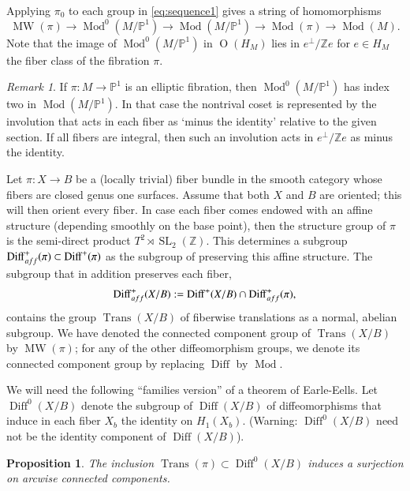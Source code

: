 \documentclass[10pt,letterpaper]{amsart}
\numberwithin{equation}{section}
\def\PP{{\mathbb P}}
\def\Pb{{\mathbb P}}
\def\ZZ{{\mathbb Z}}
\def\aff{{\rm aff}}
\newcommand\Diff{\operatorname{Diff}}
\newcommand\Mod{\operatorname{Mod}}
\newcommand\MW{\operatorname{MW}}
\newcommand\SL{\operatorname{SL}}
\newcommand\Orth{\operatorname{O}}
\newcommand\Trans{\operatorname{Trans}}
\newtheorem{proposition}[theorem]{Proposition}
\theoremstyle{remark}
\newtheorem{remark}[theorem]{Remark}
\begin{document}
Applying $\pi_0$ to each group in \eqref{eq:sequence1} gives a string of homomorphisms
\begin{equation}
\label{eq:sequence2}
\MW(\pi)\to\Mod^0(M/\Pb^1)\to\Mod(M/\Pb^1)\to
\Mod(\pi)\to\Mod(M).
\end{equation}
Note that the image of $\Mod^0(M/\Pb^1)$ in $\Orth(H_M)$ lies in $e^\perp/\ZZ e$ for $e\in H_M$ the fiber class of the fibration $\pi$.

\begin{remark}\label{rem:index2}
If $\pi:M\to \PP^1$ is an elliptic fibration, then  $\Mod^0(M/\Pb^1)$  has index two in $\Mod(M/\Pb^1)$. In that case the nontrival coset is represented by the  involution that acts in each fiber as `minus the identity' relative to the given section. If all fibers are integral,  then such an involution acts in $e^\perp/\ZZ e$ as minus the identity.
\end{remark}

Let $\pi :X\to B$ be a (locally trivial) fiber bundle in the smooth category whose 
fibers are closed genus one surfaces.  Assume that both $X$ and $B$ are oriented; this will 
then  orient every fiber.  In case each fiber comes  endowed with an affine structure 
(depending smoothly on the base point), then  the structure group of $\pi$ is the 
semi-direct product  $T^2\rtimes \SL_2(\ZZ)$. This determines a subgroup 
$\Diff^+_\aff (\pi)\subset \Diff^+(\pi)$ as the subgroup of preserving this  affine structure.
The subgroup that in addition preserves each fiber, 
\[
\Diff^+_\aff(X/B):=\Diff^+(X/B) \cap \Diff^+_\aff (\pi),
\] 
contains 
the group $\Trans(X/B)$ of  fiberwise translations as a normal, abelian  subgroup.  We have denoted the  connected component group of $\Trans(X/B)$ by $\MW(\pi)$; for any of the other diffeomorphism groups,  we denote its connected component group by replacing 
$\Diff$ by $\Mod$. 

We will need the following ``families version'' of a theorem of Earle-Eells.  Let $\Diff^0(X/B)$ 
 denote the subgroup of $\Diff(X/B)$ of diffeomorphisms that induce in each fiber $X_b$ the identity on $H_1(X_b)$.  (Warning: 
 $\Diff^0(X/B)$ need not be the identity component of $\Diff(X/B)$).
 
\begin{proposition}
\label{prop:trans2}
 The inclusion $\Trans(\pi)\subset \Diff^0(X/B)$ induces a surjection on arcwise connected components. 
\end{proposition}
\end{document}
